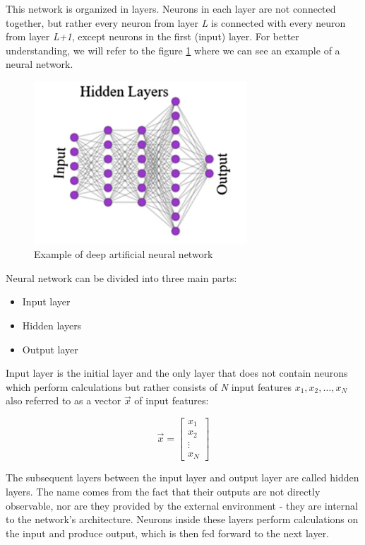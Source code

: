 This network is organized in layers. Neurons in each layer are not connected together, but rather every neuron from layer \textit{L} is connected with every neuron from layer \textit{L+1}, except neurons in the first (input) layer. For better understanding, we will refer to the figure \ref{tab:artificial-nn} where we can see an example of a neural network.

\begin{figure}[H]
\begin{centering}
\includegraphics[width=8cm]{assets/images/neural_net.png}
\par\end{centering}
\caption{Example of deep artificial neural network \cite{TalaeiKhoei2023}}
\label{tab:artificial-nn}
\end{figure}

Neural network can be divided into three main parts:

\begin{itemize}
    \item Input layer
    \item Hidden layers
    \item Output layer
\end{itemize}

Input layer is the initial layer and the only layer that does not contain neurons which perform calculations but rather consists of \textit{N} input features $x_1, x_2, \dots, x_N$ also referred to as a vector $\vec{x}$ of input features:

\[
\vec{x} = \begin{bmatrix}
x_1 \\
x_2 \\
\vdots \\
x_N
\end{bmatrix}
\]

The subsequent layers between the input layer and output layer are called hidden layers. The name comes from the fact that their outputs are not directly observable, nor are they provided by the external environment - they are internal to the network's architecture. Neurons inside these layers perform calculations on the input and produce output, which is then fed forward to the next layer.

